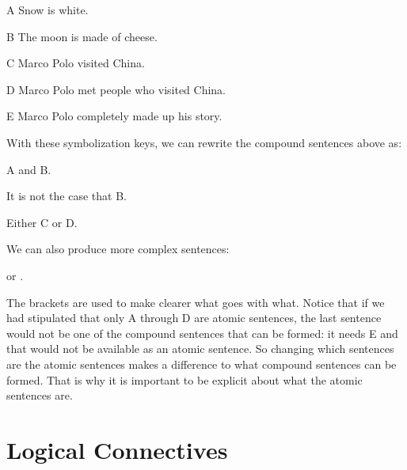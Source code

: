 \begin{lkey*}

\item[A] Snow is white.

\item[B] The moon is made of cheese.

\item[C] Marco Polo visited China.

\item[D] Marco Polo met people who visited China.

\item[E] Marco Polo completely made up his story.

\end{lkey*}

With these symbolization keys, we can rewrite the compound sentences above as:

\begin{slist}

 \item A and B.

 \item It is not the case that B.

 \item Either C or D.

\end{slist}

We can also produce more complex sentences:

\begin{slist}

\item {} or 
 .

\end{slist}

The brackets are used to make clearer what goes with what. Notice that if we had 
stipulated that only A through D are atomic sentences, the last sentence would 
not be one of the compound sentences that can be formed: it needs E and that 
would not be available as an atomic sentence. So changing which sentences are 
the atomic sentences makes a difference to what compound sentences can be 
formed.  That is why it is important to be explicit about what the atomic 
sentences are. 



\section{Logical Connectives}

